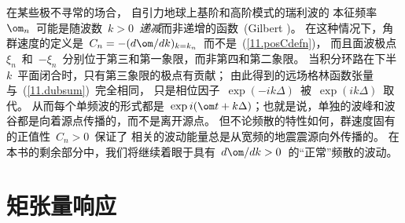 在某些极不寻常的场合，
自引力地球上基阶和高阶模式的瑞利波的
%
本征频率~$\om_n$~可能是随波数~$k>0$~{\em 递减\/}而非递增的函数~(Gilbert \citeyear{gilbert67})。
在这种情况下，角群速度的定义是~$C_n=-(d\om/dk)_{k=k_n}$~而不是~(\ref{11.posCdefn})，
而且面波极点~$\xi_n$~和~$-\xi_n$~分别位于第三和第一象限，而非第四和第二象限。
当积分环路在下半~$k$~平面闭合时，只有第三象限的极点有贡献；
由此得到的远场格林函数张量与~(\ref{11.dubsum})~完全相同，
只是相位因子~$\exp(-ik\Delta)$~被~$\exp(ik\Delta)$~取代。
从而每个单频波的形式都是~$\exp\hspace{0.1 mm}i(\om t+k\Delta)$；也就是说，单独的波峰和波谷都是向着源点传播的，而不是离开源点。
但不论频散的特性如何，群速度固有的正值性~$C_n>0$~保证了
相关的波动能量总是从宽频的地震震源向外传播的。
在本书的剩余部分中，我们将继续着眼于具有~$d\om/dk>0$~的“正常”频散的波动。
%
%
%

\section{矩张量响应}
%
%
%
\label{sec.11.resp}

